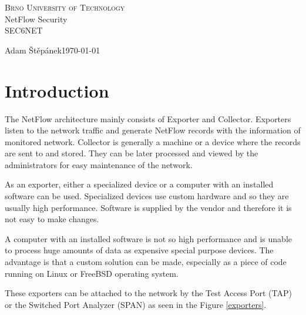 \documentclass[11pt,a4paper]{article}
\begin{document}
\begin{titlepage}

\thispagestyle{empty}

\begin{center}
  \LARGE
  \textsc{Brno University of Technology}\\
  \medskip
  {\Huge NetFlow Security}\\
  \medskip
  {\LARGE SEC6NET}
  \medskip
  \smallskip

{\Large Adam Štěpánek\hfill\today}

\end{center}

\end{titlepage}

\newpage



\section{Introduction}

The NetFlow architecture mainly consists of Exporter and Collector. Exporters listen to the network traffic and generate NetFlow records with the information of monitored network. Collector is generally a machine or a device where the records are sent to and stored. They can be later processed and viewed by the administrators for easy maintenance of the network.

As an exporter, either a specialized device or a computer with an installed software can be used. Specialized devices use custom hardware and so they are usually high performance. Software is supplied by the vendor and therefore it is not easy to make changes.

A computer with an installed software is not so high performance and is unable to process huge amounts of data as expensive special purpose devices. The advantage is that a custom solution can be made, especially as a piece of code running on Linux or FreeBSD operating system.

These exporters can be attached to the network by the Test Access Port (TAP) or the Switched Port Analyzer (SPAN) as seen in the Figure \ref{exporters}.
\end{document}
